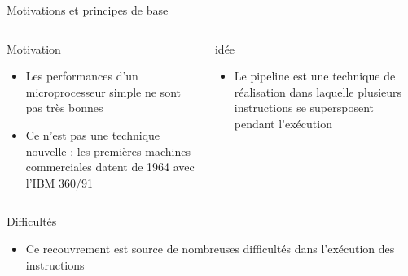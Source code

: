 %
\begin{Frame}{Motivations et principes de base}
  \begin{columns}[t]
    \begin{column}{7cm} %
      \begin{block}{Motivation}
        \begin{itemize}
        \item Les performances d'un microprocesseur simple ne sont pas très bonnes
	\item Ce n'est pas une technique nouvelle : les premières machines commerciales datent de 1964 avec l'IBM 360/91
        \end{itemize}
      \end{block} 
    \end{column}
    
    \begin{column}{4cm} %
      \begin{block}{idée}
\begin{itemize}
        \item Le pipeline est une technique de réalisation dans laquelle plusieurs instructions se supersposent pendant l'exécution
        \end{itemize}
      \end{block}   
    \end{column}
  \end{columns}  

\begin{block}{Difficultés}
       \begin{center}
 	\begin{itemize}
         \item Ce recouvrement est source de nombreuses difficultés dans l'exécution des instructions
        \end{itemize}
       \end{center}
      \end{block}   

\end{Frame}


